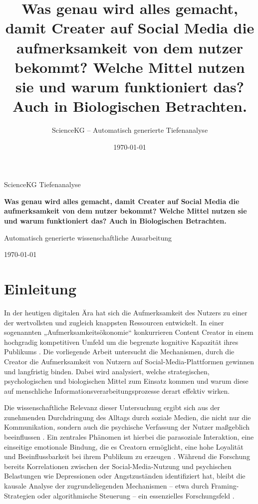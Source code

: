 \documentclass[11pt,a4paper]{article}
\title{Was genau wird alles gemacht, damit Creater auf Social Media die aufmerksamkeit von dem nutzer bekommt? Welche Mittel nutzen sie und warum funktioniert das? Auch in Biologischen Betrachten.}
\author{ScienceKG -- Automatisch generierte Tiefenanalyse}
\date{\today}
\begin{document}
\begin{titlepage}
\centering
{\large ScienceKG \textendash{} Tiefenanalyse\par}
\vspace{2.5cm}
{\huge\bfseries Was genau wird alles gemacht, damit Creater auf Social Media die aufmerksamkeit von dem nutzer bekommt? Welche Mittel nutzen sie und warum funktioniert das? Auch in Biologischen Betrachten.\par}
\vspace{2cm}
{\large Automatisch generierte wissenschaftliche Ausarbeitung\par}
\vfill
{\large \today\par}
\end{titlepage}
\tableofcontents
\newpage
\section{Einleitung}

In der heutigen digitalen Ära hat sich die Aufmerksamkeit des Nutzers zu einer der wertvollsten und zugleich knappsten Ressourcen entwickelt. In einer sogenannten „Aufmerksamkeitsökonomie“ konkurrieren Content Creator in einem hochgradig kompetitiven Umfeld um die begrenzte kognitive Kapazität ihres Publikums . Die vorliegende Arbeit untersucht die Mechanismen, durch die Creator die Aufmerksamkeit von Nutzern auf Social-Media-Plattformen gewinnen und langfristig binden. Dabei wird analysiert, welche strategischen, psychologischen und biologischen Mittel zum Einsatz kommen und warum diese auf menschliche Informationsverarbeitungsprozesse derart effektiv wirken.

Die wissenschaftliche Relevanz dieser Untersuchung ergibt sich aus der zunehmenden Durchdringung des Alltags durch soziale Medien, die nicht nur die Kommunikation, sondern auch die psychische Verfassung der Nutzer maßgeblich beeinflussen \autocite{doaj_10febcbb5e60420699a1d4570a075832,openalex_W2924664363}. Ein zentrales Phänomen ist hierbei die parasoziale Interaktion, eine einseitige emotionale Bindung, die es Creatorn ermöglicht, eine hohe Loyalität und Beeinflussbarkeit bei ihrem Publikum zu erzeugen \autocite{europepmc_42073973,grey_grey_5d5c282590c448fc8776b04f78a08de5}. Während die Forschung bereits Korrelationen zwischen der Social-Media-Nutzung und psychischen Belastungen wie Depressionen oder Angstzuständen identifiziert hat, bleibt die kausale Analyse der zugrundeliegenden Mechanismen – etwa durch Framing-Strategien oder algorithmische Steuerung – ein essenzielles Forschungsfeld \autocite{arxiv_2406_13820,openalex_W2924664363,crossref_10_3389_fpsyg_2026_1840700}.
\end{document}
